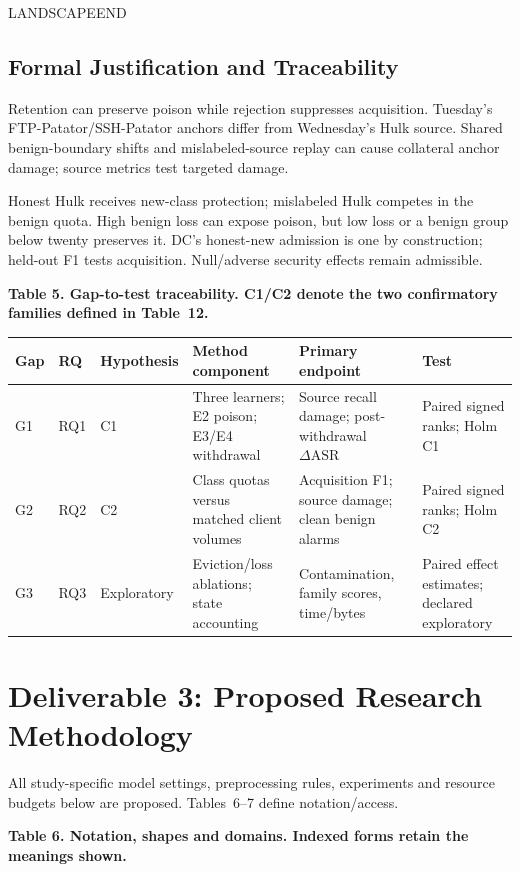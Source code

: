 \documentclass[10pt,a4paper]{article}
\begin{document}
\par LANDSCAPEEND



\subsection{Formal Justification and Traceability}
Retention can preserve poison while rejection suppresses acquisition. Tuesday's FTP-Patator/SSH-Patator anchors differ from Wednesday's Hulk source. Shared benign-boundary shifts and mislabeled-source replay can cause collateral anchor damage; source metrics test targeted damage.

Honest Hulk receives new-class protection; mislabeled Hulk competes in the benign quota. High benign loss can expose poison, but low loss or a benign group below twenty preserves it. DC's honest-new admission is one by construction; held-out F1 tests acquisition. Null/adverse security effects remain admissible.


\centering\footnotesize
\par\textbf{Table 5. Gap-to-test traceability. C1/C2 denote the two confirmatory families defined in Table~12.}\par


\begin{longtable}{p{0.7cm}p{0.8cm}p{1.2cm}l l l}
\toprule
Gap & RQ & Hypothesis & Method component & Primary endpoint & Test\\
\midrule
G1 & RQ1 & C1 & Three learners; E2 poison; E3/E4 withdrawal & Source recall damage; post-withdrawal $\Delta\mathrm{ASR}$ & Paired signed ranks; Holm C1\\
G2 & RQ2 & C2 & Class quotas versus matched client volumes & Acquisition F1; source damage; clean benign alarms & Paired signed ranks; Holm C2\\
G3 & RQ3 & Exploratory & Eviction/loss ablations; state accounting & Contamination, family scores, time/bytes & Paired effect estimates; declared exploratory\\
\bottomrule
\end{longtable}


\section{Deliverable 3: Proposed Research Methodology}
All study-specific model settings, preprocessing rules, experiments and resource budgets below are proposed. Tables~6--7 define notation/access.


\centering\scriptsize
\par\textbf{Table 6. Notation, shapes and domains. Indexed forms retain the meanings shown.}\par
\end{document}
